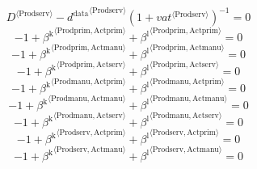 \begin{equation}
{D}^{\langle \mathrm{Prodserv}\rangle} - {{d^{\mathrm{data}}}^{\langle \mathrm{\mathrm{Prodserv}}\rangle}} \left(1 + {{v\!a\!t}}^{\langle \mathrm{\mathrm{Prodserv}}\rangle}\right)^{-1} = 0
\end{equation}
\begin{equation}
-1 + {\beta^{\mathrm{k}}}^{\langle \mathrm{\mathrm{Prodprim}},\mathrm{\mathrm{Actprim}}\rangle} + {\beta^{\mathrm{l}}}^{\langle \mathrm{\mathrm{Prodprim}},\mathrm{\mathrm{Actprim}}\rangle} = 0
\end{equation}
\begin{equation}
-1 + {\beta^{\mathrm{k}}}^{\langle \mathrm{\mathrm{Prodprim}},\mathrm{\mathrm{Actmanu}}\rangle} + {\beta^{\mathrm{l}}}^{\langle \mathrm{\mathrm{Prodprim}},\mathrm{\mathrm{Actmanu}}\rangle} = 0
\end{equation}
\begin{equation}
-1 + {\beta^{\mathrm{k}}}^{\langle \mathrm{\mathrm{Prodprim}},\mathrm{\mathrm{Actserv}}\rangle} + {\beta^{\mathrm{l}}}^{\langle \mathrm{\mathrm{Prodprim}},\mathrm{\mathrm{Actserv}}\rangle} = 0
\end{equation}
\begin{equation}
-1 + {\beta^{\mathrm{k}}}^{\langle \mathrm{\mathrm{Prodmanu}},\mathrm{\mathrm{Actprim}}\rangle} + {\beta^{\mathrm{l}}}^{\langle \mathrm{\mathrm{Prodmanu}},\mathrm{\mathrm{Actprim}}\rangle} = 0
\end{equation}
\begin{equation}
-1 + {\beta^{\mathrm{k}}}^{\langle \mathrm{\mathrm{Prodmanu}},\mathrm{\mathrm{Actmanu}}\rangle} + {\beta^{\mathrm{l}}}^{\langle \mathrm{\mathrm{Prodmanu}},\mathrm{\mathrm{Actmanu}}\rangle} = 0
\end{equation}
\begin{equation}
-1 + {\beta^{\mathrm{k}}}^{\langle \mathrm{\mathrm{Prodmanu}},\mathrm{\mathrm{Actserv}}\rangle} + {\beta^{\mathrm{l}}}^{\langle \mathrm{\mathrm{Prodmanu}},\mathrm{\mathrm{Actserv}}\rangle} = 0
\end{equation}
\begin{equation}
-1 + {\beta^{\mathrm{k}}}^{\langle \mathrm{\mathrm{Prodserv}},\mathrm{\mathrm{Actprim}}\rangle} + {\beta^{\mathrm{l}}}^{\langle \mathrm{\mathrm{Prodserv}},\mathrm{\mathrm{Actprim}}\rangle} = 0
\end{equation}
\begin{equation}
-1 + {\beta^{\mathrm{k}}}^{\langle \mathrm{\mathrm{Prodserv}},\mathrm{\mathrm{Actmanu}}\rangle} + {\beta^{\mathrm{l}}}^{\langle \mathrm{\mathrm{Prodserv}},\mathrm{\mathrm{Actmanu}}\rangle} = 0
\end{equation}
